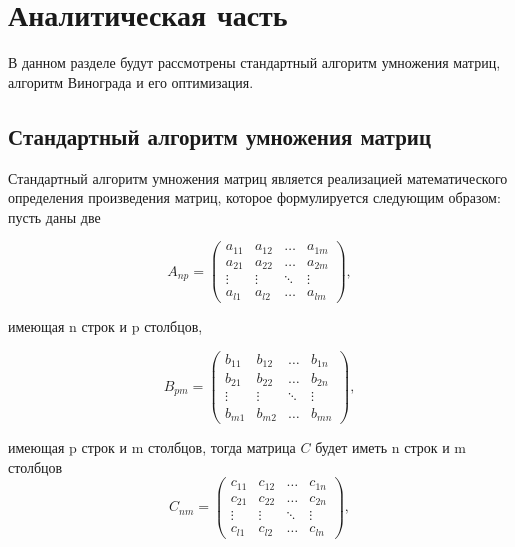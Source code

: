 \chapter{Аналитическая часть}

В данном разделе будут рассмотрены стандартный алгоритм 
умножения матриц, алгоритм Винограда и его оптимизация.

\section{Стандартный алгоритм умножения матриц}

Стандартный алгоритм умножения матриц является реализацией математического определения
произведения матриц, которое формулируется следующим образом: пусть даны две 

\begin{equation}
    A_{np} = \begin{pmatrix}
            a_{11} & a_{12} & \ldots & a_{1m}\\
            a_{21} & a_{22} & \ldots & a_{2m}\\
            \vdots & \vdots & \ddots & \vdots\\
            a_{l1} & a_{l2} & \ldots & a_{lm}
    \end{pmatrix},
\end{equation}

имеющая n строк и p столбцов,

\begin{equation}
    B_{pm} = \begin{pmatrix}
            b_{11} & b_{12} & \ldots & b_{1n}\\
            b_{21} & b_{22} & \ldots & b_{2n}\\
            \vdots & \vdots & \ddots & \vdots\\
            b_{m1} & b_{m2} & \ldots & b_{mn}
        \end{pmatrix},
\end{equation}

имеющая p строк и m столбцов, тогда матрица $C$ будет иметь n строк и m столбцов
\begin{equation}
	C_{nm} = \begin{pmatrix}
		c_{11} & c_{12} & \ldots & c_{1n}\\
		c_{21} & c_{22} & \ldots & c_{2n}\\
		\vdots & \vdots & \ddots & \vdots\\
		c_{l1} & c_{l2} & \ldots & c_{ln}
	\end{pmatrix},
\end{equation}

